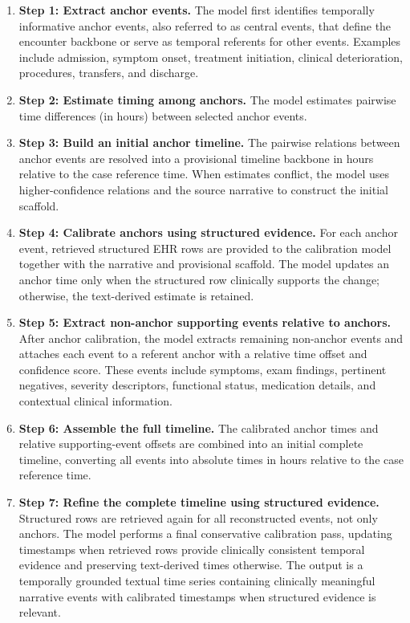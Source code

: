 \begin{enumerate}
    \item \textbf{Step 1: Extract anchor events.} The model first identifies temporally informative anchor events, also referred to as central events, that define the encounter backbone or serve as temporal referents for other events.
Examples include admission, symptom onset, treatment initiation, clinical deterioration, procedures, transfers, and discharge. 

    \item \textbf{Step 2: Estimate timing among anchors.} The model estimates pairwise time differences (in hours) between selected anchor events.

    \item \textbf{Step 3: Build an initial anchor timeline.} The pairwise relations between anchor events are resolved into a provisional timeline backbone in hours relative to the case reference time.
When estimates conflict, the model uses higher-confidence relations and the source narrative to construct the initial scaffold.

    \item \textbf{Step 4: Calibrate anchors using structured evidence.} For each anchor event, retrieved structured EHR rows are provided to the calibration model together with the narrative and provisional scaffold.
The model updates an anchor time only when the structured row clinically supports the change; otherwise, the text-derived estimate is retained.

    \item \textbf{Step 5: Extract non-anchor supporting events relative to anchors.} After anchor calibration, the model extracts remaining non-anchor events and attaches each event to a referent anchor with a relative time offset and confidence score.
These events include symptoms, exam findings, pertinent negatives, severity descriptors, functional status, medication details, and contextual clinical information.
    
    \item \textbf{Step 6: Assemble the full timeline.} The calibrated anchor times and relative supporting-event offsets are combined into an initial complete timeline, converting all events into absolute times in hours relative to the case reference time.
    
    \item \textbf{Step 7: Refine the complete timeline using structured evidence.} Structured rows are retrieved again for all reconstructed events, not only anchors.
The model performs a final conservative calibration pass, updating timestamps when retrieved rows provide clinically consistent temporal evidence and preserving text-derived times otherwise.
The output is a temporally grounded textual time series containing clinically meaningful narrative events with calibrated timestamps when structured evidence is relevant.
\end{enumerate}


